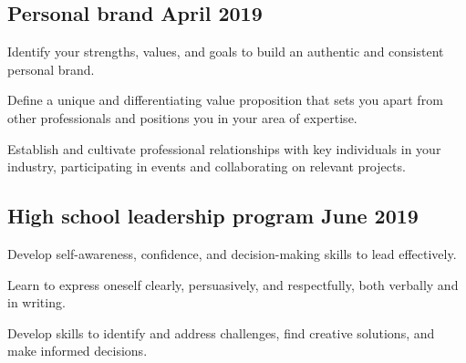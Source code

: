 \subsection{Personal brand \hfill April 2019}
\begin{zitemize}
\item Identify your strengths, values, and goals to build an authentic and consistent personal brand.
\item Define a unique and differentiating value proposition that sets you apart from other professionals and positions you in your area of expertise.
\item Establish and cultivate professional relationships with key individuals in your industry, participating in events and collaborating on relevant projects.
\end{zitemize}

\subsection{High school leadership program \hfill June 2019}
\begin{zitemize}
\item Develop self-awareness, confidence, and decision-making skills to lead effectively.
\item Learn to express oneself clearly, persuasively, and respectfully, both verbally and in writing.
\item Develop skills to identify and address challenges, find creative solutions, and make informed decisions.
\end{zitemize}

